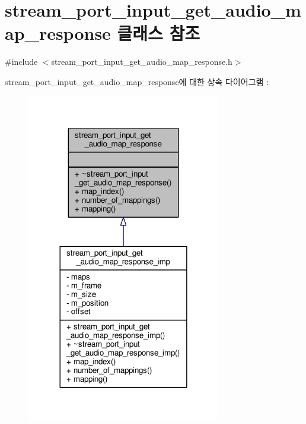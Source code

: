 \hypertarget{classavdecc__lib_1_1stream__port__input__get__audio__map__response}{}\section{stream\+\_\+port\+\_\+input\+\_\+get\+\_\+audio\+\_\+map\+\_\+response 클래스 참조}
\label{classavdecc__lib_1_1stream__port__input__get__audio__map__response}


{\ttfamily \#include $<$stream\+\_\+port\+\_\+input\+\_\+get\+\_\+audio\+\_\+map\+\_\+response.\+h$>$}



stream\+\_\+port\+\_\+input\+\_\+get\+\_\+audio\+\_\+map\+\_\+response에 대한 상속 다이어그램 \+: 
\nopagebreak
\begin{figure}[H]
\begin{center}
\leavevmode
\includegraphics[width=240pt]{classavdecc__lib_1_1stream__port__input__get__audio__map__response__inherit__graph}
\end{center}
\end{figure}



